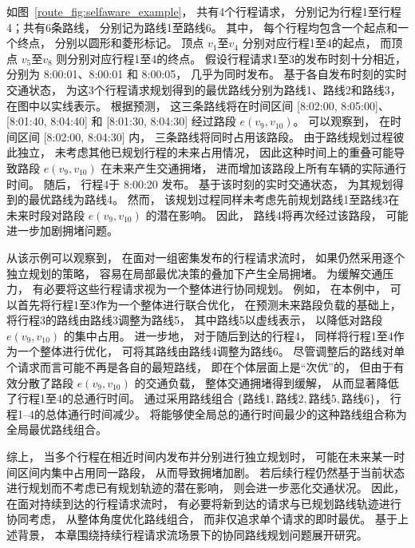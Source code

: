 \begin{example}[个人最优下潜在交通拥堵示例]
    如图~\ref{route_fig:selfaware_example}， 共有4个行程请求， 分别记为行程1至行程4；共有6条路线， 分别记为路线1至路线6。 其中， 每个行程均包含一个起点和一个终点， 分别以圆形和菱形标记。 顶点 $v_1$至$v_4$ 分别对应行程1至4的起点， 而顶点 $v_5$至$v_8$ 则分别对应行程1至4的终点。 假设行程请求1至3的发布时刻十分相近， 分别为 8:00:01、8:00:01 和 8:00:05， 几乎为同时发布。 基于各自发布时刻的实时交通状态， 为这3个行程请求规划得到的最优路线分别为路线1、路线2和路线3， 在图中以实线表示。 根据预测， 这三条路线将在时间区间 [8:02:00, 8:05:00]、[8:01:40, 8:04:40] 和 [8:01:30, 8:04:30] 经过路段 $e(v_9,v_{10})$。 可以观察到， 在时间区间 [8:02:00, 8:04:30] 内， 三条路线将同时占用该路段。 由于路线规划过程彼此独立， 未考虑其他已规划行程的未来占用情况， 因此这种时间上的重叠可能导致路段 $e(v_9,v_{10})$ 在未来产生交通拥堵， 进而增加该路段上所有车辆的实际通行时间。 随后， 行程4于 8:00:20 发布。 基于该时刻的实时交通状态， 为其规划得到的最优路线为路线4。 然而， 该规划过程同样未考虑先前规划路线1至路线3在未来时段对路段 $e(v_9,v_{10})$ 的潜在影响。 因此， 路线4将再次经过该路段， 可能进一步加剧拥堵问题。
\end{example}
从该示例可以观察到， 在面对一组密集发布的行程请求流时， 如果仍然采用逐个独立规划的策略， 容易在局部最优决策的叠加下产生全局拥堵。 为缓解交通压力， 有必要将这些行程请求视为一个整体进行协同规划。 例如， 在本例中， 可以首先将行程1至3作为一个整体进行联合优化， 在预测未来路段负载的基础上， 将行程3的路线由路线3调整为路线5， 其中路线5以虚线表示， 以降低对路段 $e(v_9,v_{10})$ 的集中占用。 进一步地， 对于随后到达的行程4， 同样将行程1至4作为一个整体进行优化， 可将其路线由路线4调整为路线6。 尽管调整后的路线对单个请求而言可能不再是各自的最短路线， 即在个体层面上是“次优”的， 但由于有效分散了路段 $e(v_9,v_{10})$ 的交通负载， 整体交通拥堵得到缓解， 从而显著降低了行程1至4的总通行时间。 通过采用路线组合 $\{路线 1, 路线 2, 路线 5, 路线 6\}$， 行程1–4的总体通行时间减少。 将能够使全局总的通行时间最少的这种路线组合称为全局最优路线组合。

综上， 当多个行程在相近时间内发布并分别进行独立规划时， 可能在未来某一时间区间内集中占用同一路段， 从而导致拥堵加剧。 若后续行程仍然基于当前状态进行规划而不考虑已有规划轨迹的潜在影响， 则会进一步恶化交通状况。 因此， 在面对持续到达的行程请求流时， 有必要将新到达的请求与已规划路线轨迹进行协同考虑， 从整体角度优化路线组合， 而非仅追求单个请求的即时最优。 基于上述背景， 本章围绕持续行程请求流场景下的协同路线规划问题展开研究。


